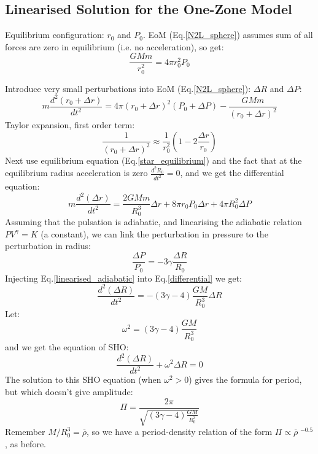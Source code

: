 \documentclass{spy}
\begin{document}
\subsection{Linearised Solution for the One-Zone Model}
Equilibrium configuration: \(r_\mathrm{0}\) and \(P_\mathrm{0}\).  EoM (Eq.\ref{N2L_sphere}) assumes sum of all forces are zero in equilibrium (i.e. no acceleration), so get: 
\begin{equation}
     \frac{GMm}{r^2_\mathrm{0}} = 4\pi r^2_\mathrm{0} P_\mathrm{0}
     \label{star_equilibrium}
\end{equation}

Introduce very small perturbations into EoM (Eq.\ref{N2L_sphere}): \(\Delta R\) and \(\Delta P\): 
\begin{equation}
      m\frac{d^2(r_\mathrm{0} + \Delta r)}{dt^2} = 4 \pi (r_\mathrm{0} + \Delta r)^2 (P_\mathrm{0} + \Delta P) - \frac{GMm}{(r_\mathrm{0} + \Delta r)^2}
\end{equation}
Taylor expansion, first order term:
\begin{equation}
      \frac{1}{(r_\mathrm{0} + \Delta r)^2} \approx \frac{1}{r_\mathrm{0}^2}(1 - 2 \frac{\Delta r}{r_\mathrm{0}})
\end{equation}
Next use equilibrium equation (Eq.\ref{star_equilibrium}) and the fact that at the equilibrium radius acceleration is zero \(\frac{d^2R_\mathrm{0}}{dt^2} = 0\), and we get the differential equation:
\begin{equation}
      m\frac{d^2(\Delta r)}{dt^2} = \frac{2GMm}{R^3_\mathrm{0}}\Delta r + 8\pi r_\mathrm{0} P_\mathrm{0} \Delta r + 4\pi R^2_\mathrm{0} \Delta P
      \label{differential}
\end{equation}
Assuming that the pulsation is adiabatic, and linearising the adiabatic relation \(PV^\gamma = K\) (a constant), we can link the perturbation in pressure to the perturbation in radius:
\begin{equation}
      \frac{\Delta P }{P_\mathrm{0}} = -3 \gamma \frac{\Delta R}{R_\mathrm{0}}
      \label{linearised_adiabatic}
\end{equation}
Injecting Eq.\ref{linearised_adiabatic} into Eq.\ref{differential} we get:
\begin{equation}
      \frac{d^2(\Delta R)}{dt^2} = -(3\gamma - 4)\frac{GM}{R^3_\mathrm{0}} \Delta R
\end{equation}
Let:
\begin{equation}
      \omega^2 = (3\gamma - 4)\frac{GM}{R^3_\mathrm{0}}
\end{equation}
and we get the equation of SHO:
\begin{equation}
      \frac{d^2(\Delta R)}{dt^2} + \omega^2 \Delta R = 0
\end{equation}
The solution to this SHO equation (when \(\omega^2 > 0\)) gives the formula for period, but which doesn't give amplitude:
\begin{equation}
    \Pi = \frac{2\pi}{\sqrt{(3\gamma - 4)\frac{GM}{R^3_\mathrm{0}}}}
\end{equation}
Remember \(M/R^3_\mathrm{0} = \overline{\rho}\), so we have a period-density relation of the form \(\Pi \propto \overline{\rho} \; ^{-0.5}\), as before. 
\end{document}
